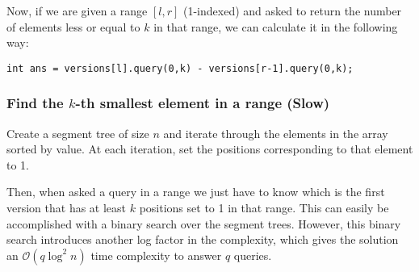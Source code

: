 Now, if we are given a range $[l,r]$ (1-indexed) and asked to return the number
of elements
less or equal to $k$ in that range, we can calculate it in the following way:
\begin{verbatim}
int ans = versions[l].query(0,k) - versions[r-1].query(0,k);
\end{verbatim}
\subsubsection{Find the $k$-th smallest element in a range (Slow)}
Create a segment tree of size $n$ and iterate through the elements in the 
array sorted by value. At each iteration, set the positions corresponding 
to that element to 1. 

Then, when asked a query in a range we just have to know which is the first
version that has at least $k$ positions set to 1 in that range. 
This can easily be accomplished with a binary search over the segment trees. 
However, this binary search introduces another log factor in the complexity,
which gives the solution an $\mathcal{O}(q\log^2n)$ time complexity to answer
$q$ queries.
\newpage
